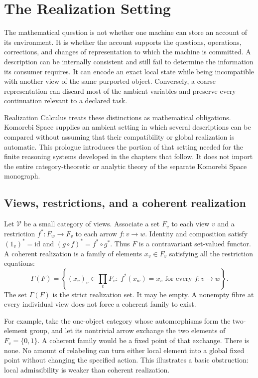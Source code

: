 \chapter*{The Realization Setting}

The mathematical question is not whether one machine can store an account of its environment. It is whether the account supports the questions, operations, corrections, and changes of representation to which the machine is committed. A description can be internally consistent and still fail to determine the information its consumer requires. It can encode an exact local state while being incompatible with another view of the same purported object. Conversely, a coarse representation can discard most of the ambient variables and preserve every continuation relevant to a declared task.

Realization Calculus treats these distinctions as mathematical obligations. Komorebi Space supplies an ambient setting in which several descriptions can be compared without assuming that their compatibility or global realization is automatic. This prologue introduces the portion of that setting needed for the finite reasoning systems developed in the chapters that follow. It does not import the entire category-theoretic or analytic theory of the separate Komorebi Space monograph.

\section*{Views, restrictions, and a coherent realization}
Let $\mathcal V$ be a small category of views. Associate a set $F_v$ to each view $v$ and a restriction $f^*:F_w\to F_v$ to each arrow $f:v\to w$. Identity and composition satisfy $(1_v)^*=\mathrm{id}$ and $(g\circ f)^*=f^*\circ g^*$. Thus $F$ is a contravariant set-valued functor. A coherent realization is a family of elements $x_v\in F_v$ satisfying all the restriction equations:
\[
\Gamma(F)=\left\{(x_v)_v\in\prod_v F_v:\ f^*(x_w)=x_v\text{ for every }f:v\to w\right\}.
\]
The set $\Gamma(F)$ is the strict realization set. It may be empty. A nonempty fibre at every individual view does not force a coherent family to exist.

For example, take the one-object category whose automorphisms form the two-element group, and let its nontrivial arrow exchange the two elements of $F_v=\{0,1\}$. A coherent family would be a fixed point of that exchange. There is none. No amount of relabeling can turn either local element into a global fixed point without changing the specified action. This illustrates a basic obstruction: local admissibility is weaker than coherent realization.

